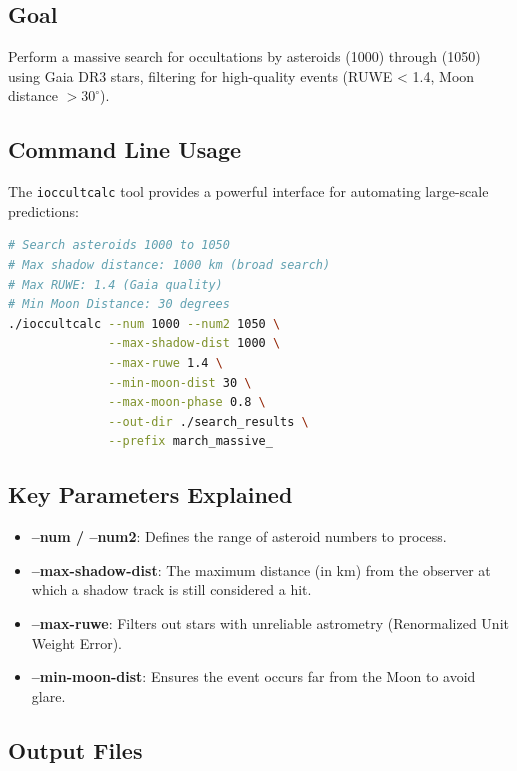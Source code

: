 \subsection{Goal}

Perform a massive search for occultations by asteroids (1000) through (1050) using Gaia DR3 stars, filtering for high-quality events (RUWE < 1.4, Moon distance $> 30^\circ$).

\subsection{Command Line Usage}

The \texttt{ioccultcalc} tool provides a powerful interface for automating large-scale predictions:

\begin{lstlisting}[language=bash,caption={Massive search with scientific filters}]
# Search asteroids 1000 to 1050
# Max shadow distance: 1000 km (broad search)
# Max RUWE: 1.4 (Gaia quality)
# Min Moon Distance: 30 degrees
./ioccultcalc --num 1000 --num2 1050 \
              --max-shadow-dist 1000 \
              --max-ruwe 1.4 \
              --min-moon-dist 30 \
              --max-moon-phase 0.8 \
              --out-dir ./search_results \
              --prefix march_massive_
\end{lstlisting}

\subsection{Key Parameters Explained}

\begin{itemize}
    \item \textbf{--num / --num2}: Defines the range of asteroid numbers to process.
    \item \textbf{--max-shadow-dist}: The maximum distance (in km) from the observer at which a shadow track is still considered a hit.
    \item \textbf{--max-ruwe}: Filters out stars with unreliable astrometry (Renormalized Unit Weight Error).
    \item \textbf{--min-moon-dist}: Ensures the event occurs far from the Moon to avoid glare.
\end{itemize}

\subsection{Output Files}

